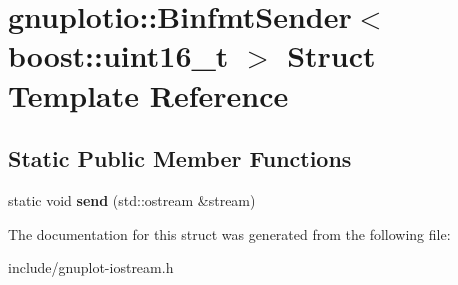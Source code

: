 \hypertarget{structgnuplotio_1_1BinfmtSender_3_01boost_1_1uint16__t_01_4}{}\section{gnuplotio\+:\+:Binfmt\+Sender$<$ boost\+:\+:uint16\+\_\+t $>$ Struct Template Reference}
\label{structgnuplotio_1_1BinfmtSender_3_01boost_1_1uint16__t_01_4}
\subsection*{Static Public Member Functions}
\begin{DoxyCompactItemize}
\item 
\mbox{\label{structgnuplotio_1_1BinfmtSender_3_01boost_1_1uint16__t_01_4_a7bb7f0a62a21496b9e85ce35f0170717}} 
static void {\bfseries send} (std\+::ostream \&stream)
\end{DoxyCompactItemize}


The documentation for this struct was generated from the following file\+:\begin{DoxyCompactItemize}
\item 
include/gnuplot-\/iostream.\+h\end{DoxyCompactItemize}
